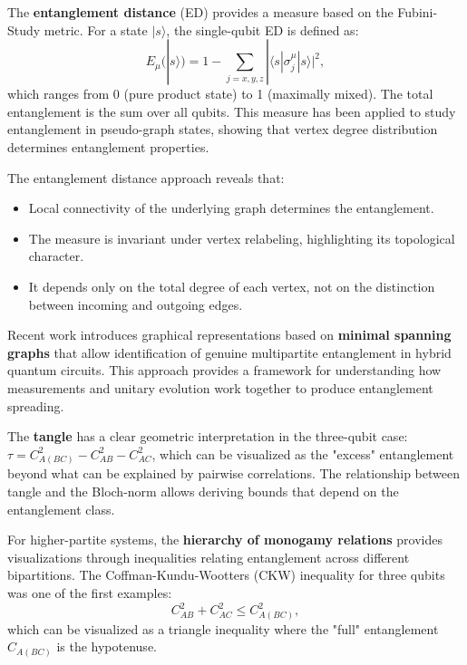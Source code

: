 \documentclass[%
 amsmath,amssymb,
 aps,
rmp,
]{revtex4-2}
\begin{document}
The \textbf{entanglement distance} (ED) \cite{EntanglementDistance} provides a measure based on the Fubini-Study metric. For a state $|s\rangle$, the single-qubit ED is defined as:
\begin{equation}
	E_\mu(|s\rangle) = 1 - \sum_{j=x,y,z} |\langle s|\sigma_j^\mu|s\rangle|^2,
\end{equation}
which ranges from 0 (pure product state) to 1 (maximally mixed). The total entanglement is the sum over all qubits. This measure has been applied to study entanglement in pseudo-graph states, showing that vertex degree distribution determines entanglement properties.

The entanglement distance approach reveals that:
\begin{itemize}
	\item Local connectivity of the underlying graph determines the entanglement.
	\item The measure is invariant under vertex relabeling, highlighting its topological character.
	\item It depends only on the total degree of each vertex, not on the distinction between incoming and outgoing edges.
\end{itemize}

Recent work introduces graphical representations based on \textbf{minimal spanning graphs} that allow identification of genuine multipartite entanglement in hybrid quantum circuits. This approach provides a framework for understanding how measurements and unitary evolution work together to produce entanglement spreading.

The \textbf{tangle} has a clear geometric interpretation in the three-qubit case: $\tau = C_{A(BC)}^2 - C_{AB}^2 - C_{AC}^2$, which can be visualized as the "excess" entanglement beyond what can be explained by pairwise correlations. The relationship between tangle and the Bloch-norm allows deriving bounds that depend on the entanglement class.

For higher-partite systems, the \textbf{hierarchy of monogamy relations} provides visualizations through inequalities relating entanglement across different bipartitions. The Coffman-Kundu-Wootters (CKW) inequality for three qubits was one of the first examples:
\begin{equation}
	C_{AB}^2 + C_{AC}^2 \leq C_{A(BC)}^2,
\end{equation}
which can be visualized as a triangle inequality where the "full" entanglement $C_{A(BC)}$ is the hypotenuse.
\end{document}
